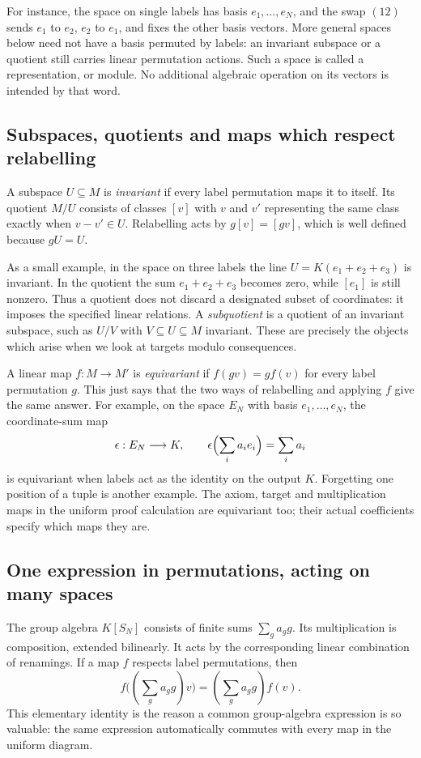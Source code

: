 \documentclass[11pt,a4paper,oneside,openany]{book}
\theoremstyle{definition}\newtheorem{definition}[theorem]{Definition}
\theoremstyle{remark}\newtheorem{remark}[theorem]{Remark}
\numberwithin{equation}{chapter}
\begin{document}
For instance, the space on single labels has basis
$e_1,\ldots,e_N$, and the swap $(12)$ sends $e_1$ to $e_2$,
$e_2$ to $e_1$, and fixes the other basis vectors. More general
spaces below need not have a basis permuted by labels: an invariant
subspace or a quotient still carries linear permutation actions.
Such a space is called a representation, or module. No additional
algebraic operation on its vectors is intended by that word.

\subsection*{Subspaces, quotients and maps which respect relabelling}
A subspace $U\subseteq M$ is \emph{invariant} if every label
permutation maps it to itself. Its quotient $M/U$ consists of classes
$[v]$ with $v$ and $v'$ representing the same class exactly when
$v-v'\in U$. Relabelling acts by $g[v]=[gv]$, which is well defined
because $gU=U$.

As a small example, in the space on three labels the line
$U=K(e_1+e_2+e_3)$ is invariant. In the quotient the sum
$e_1+e_2+e_3$ becomes zero, while $[e_1]$ is still nonzero.
Thus a quotient does not discard a designated subset of coordinates:
it imposes the specified linear relations. A \emph{subquotient} is
a quotient of an invariant subspace, such as $U/V$ with
$V\subseteq U\subseteq M$ invariant. These are precisely the
objects which arise when we look at targets modulo consequences.

A linear map $f:M\to M'$ is \emph{equivariant} if
$f(gv)=g f(v)$ for every label permutation $g$. This just says that
the two ways of relabelling and applying $f$ give the same answer.
For example, on the space $E_N$ with basis $e_1,\ldots,e_N$,
the coordinate-sum map
\[
 \epsilon:E_N\longrightarrow K,
                 \qquad\epsilon\Bigl(\sum_i a_i e_i\Bigr)=\sum_i a_i
\]
is equivariant when labels act as the identity on the output $K$.
Forgetting one position of a tuple is another example. The axiom,
target and multiplication maps in the uniform proof calculation are
equivariant too; their actual coefficients specify which maps they are.

\subsection*{One expression in permutations, acting on many spaces}
The group algebra $K[S_N]$ consists of finite sums $\sum_g a_g g$.
Its multiplication is composition, extended bilinearly. It acts by the
corresponding linear combination of renamings. If a map
$f$ respects label permutations, then
\[
                           f\bigl((\sum_g a_gg)v\bigr)
                                      = (\sum_g a_gg)f(v).
\]
This elementary identity is the reason a common group-algebra expression
is so valuable: the same expression automatically commutes with every
map in the uniform diagram.
\end{document}
